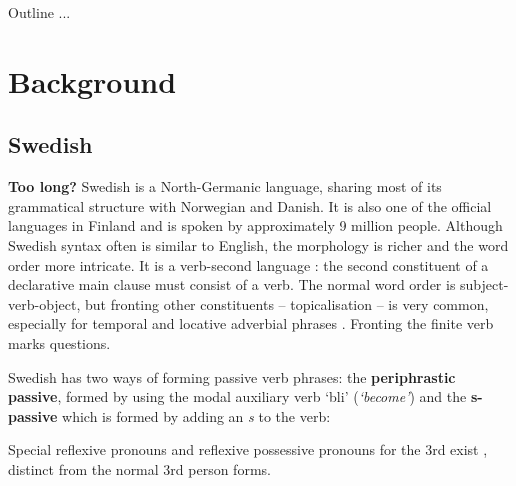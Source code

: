 \documentclass[runningheads,a4paper]{llncs}
\begin{document}
Outline ...

\section{Background}

\subsection{Swedish}

\textbf{Too long?}
Swedish is a North-Germanic language, sharing most of its grammatical structure 
with Norwegian and Danish. It is also one of the official languages in Finland
and is spoken by approximately 9 million people.
Although Swedish syntax often is similar to English, the  morphology is richer and the
word order more intricate.
It is a verb-second language \cite[p.116]{gunlog}: the
second constituent of a declarative main clause must consist of a verb.
The normal word order is subject-verb-object, but fronting other constituents
-- topicalisation -- is very common,  especially for temporal and
locative adverbial phrases \cite[]{H&H}.
Fronting the finite verb marks questions.

Swedish has two ways of forming passive verb phrases: the 
\textbf{periphrastic passive}, formed by using the modal auxiliary verb `bli' (\emph{`become'})
and the \textbf{s-passive} which is formed by adding an \emph{s} to the verb: \\
\label{gfPass:s-pass}

Special reflexive pronouns and reflexive possessive pronouns for the 3rd
exist \cite[ \& 319]{H&H}, distinct from the normal 3rd person forms.
\end{document}
